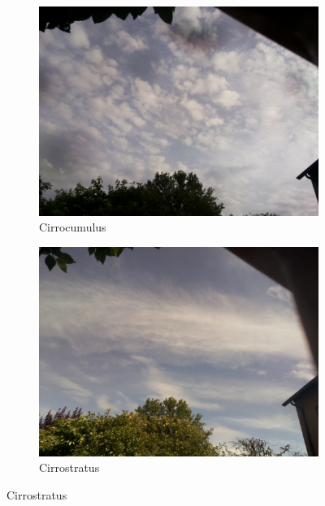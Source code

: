 \begin{figure}[h]
\begin{subfigure}[b]{0.31\textwidth}
		\label{fig:altocumulus}
		\end{subfigure}
		\begin{subfigure}[b]{0.31\textwidth}
		\begin{center}
				\includegraphics[width=\textwidth]{./pictures/cloudtypes/cirrocumulus.pdf}
		\end{center}
		\caption{Cirrocumulus}
		\label{fig:cirrocumulus}
		\end{subfigure}
		\begin{subfigure}[b]{0.31\textwidth}
		\begin{center}
				\includegraphics[width=\textwidth]{./pictures/cloudtypes/cirrostratus.pdf}
		\end{center}
		\caption{Cirrostratus}

\end{subfigure}
\end{figure}
